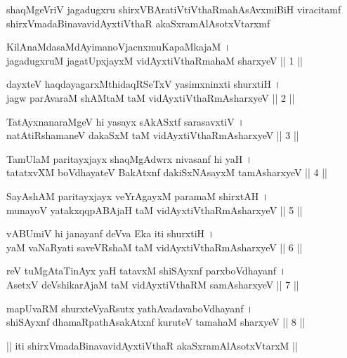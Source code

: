\begin{center}
shaqMgeVriV jagadugxru shirxVBAratiVtiVthaRmahAsAvxmiBiH viracitamf\\[3pt]
shirxVmadaBinavavidAyxtiVthaR akaSxramAlAsotxVtarxmf
\end{center}
\vskip 0.55cm

\noindent
{}KilAnaMdasaMdAyimanoVjacnxmuKapaMkajaM ।\\
jagadugxruM jagatUpxjayxM vidAyxtiVthaRmahaM sharxyeV || 1 ||
\vskip 0.55cm

\noindent
{}dayxteV haqdayagarxMthidaqRSeTxV yasimxninxti shurxtiH ।\\
jagw parAvaraM shAMtaM taM vidAyxtiVthaRmAsharxyeV || 2 ||
\vskip 0.55cm

\noindent
{}TatAyxnanaraMgeV hi yasayx sAkASxtf sarasavxtiV ।\\
natAtiRshamaneV dakaSxM taM vidAyxtiVthaRmAsharxyeV || 3 ||
\vskip 0.55cm

\noindent
{}TamUlaM paritayxjayx shaqMgAdwrx nivasanf hi yaH ।\\
tatatxvXM boVdhayateV BakAtxnf dakiSxNAsayxM tamAsharxyeV || 4 ||
\vskip 0.55cm

\noindent
{}SayAshAM paritayxjayx veYrAgayxM paramaM shirxtAH ।\\
munayoV yatakxqqpABAjaH taM vidAyxtiVthaRmAsharxyeV || 5 ||
\vskip 0.55cm

\noindent
{}vABUmiV hi janayanf deVva Eka iti shurxtiH ।\\
yaM vaNaRyati saveVRshaM taM vidAyxtiVthaRmAsharxyeV || 6 ||
\vskip 0.55cm

\noindent
{}reV tuMgAtaTinAyx yaH tatavxM shiSAyxnf parxboVdhayanf ।\\
AsetxV deVshikarAjaM taM vidAyxtiVthaRM samAsharxyeV || 7 ||
\vskip 0.55cm

\noindent
{}mapUvaRM shurxteVyaRsutx yathAvadavaboVdhayanf ।\\
shiSAyxnf dhamaRpathAsakAtxnf kuruteV tamahaM sharxyeV || 8 ||
\vskip 1cm

\centerline{|| iti shirxVmadaBinavavidAyxtiVthaR akaSxramAlAsotxVtarxM ||}

